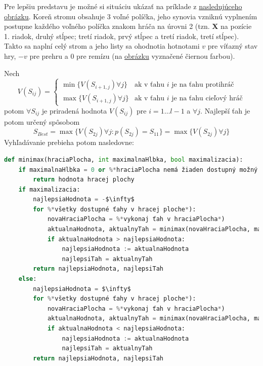 Pre lepšiu predstavu je možné si situáciu ukázať na príklade z \hyperref[figure:minimax-tree]{nasledujúceho obrázku}.
Koreň stromu obsahuje 3 voľné políčka, jeho synovia vzniknú vyplnením postupne každého voľného políčka znakom hráča na
úrovni 2 (tzn. \textbf{X} na pozície 1. riadok, druhý stĺpec; tretí riadok, prvý stĺpec a tretí riadok, tretí stĺpec).
Takto sa naplní celý strom a jeho listy sa ohodnotia hotnotami $v$ pre víťazný stav hry, $-v$ pre prehru a $0$ pre
remízu (na \hyperref[figure:minimax-tree]{obrázku} vyznačené čiernou farbou).

Nech
\begin{equation}
    V(S_{ij}) =
    \begin{cases}
        \min{\{V(S_{i+1,j}) \forall j\}} & \text{ak v ťahu } i \text{ je na ťahu protihráč} \\
        \max{\{V(S_{i+1,j}) \forall j\}} & \text{ak v ťahu } i \text{ je na ťahu cieľový hráč}
    \end{cases}
\end{equation}
potom $\forall S_{ij}$ je priradená hodnota $V(S_{ij})$ pre $i = 1 \dots l-1$ a $\forall j$.
Najlepší ťah je potom určený spôsobom
\begin{equation}
    S_{Best} = \max{\{V(S_{2j}) \forall j \colon p(S_{2j}) = S_{11}\}} = \max{\{V(S_{2j}) \forall j\}}
\end{equation}
Vyhľadávanie prebieha potom nasledovne:\cite{algo_minimax_pseudocode}
\begin{tiny}
    \begin{lstlisting}[language=Python]
def minimax(hraciaPlocha, int maximalnaHlbka, bool maximalizacia):
    if maximalnaHlbka = 0 or %*hraciaPlocha nemá žiaden dostupný možný ťah*):
        return hodnota hracej plochy
    if maximalizacia:
        najlepsiaHodnota = -$\infty$
        for %*všetky dostupné ťahy v hracej ploche*):
            novaHraciaPlocha = %*vykonaj ťah v hraciaPlocha*)
            aktualnaHodnota, aktualnyTah = minimax(novaHraciaPlocha, maximalnaHlbka - 1, false))
            if aktualnaHodnota > najlepsiaHodnota:
                najlepsiaHodnota := aktualnaHodnota
                najlepsiTah = aktualnyTah
        return najlepsiaHodnota, najlepsiTah
    else:
        najlepsiaHodnota = $\infty$
        for %*všetky dostupné ťahy v hracej ploche*):
            novaHraciaPlocha = %*vykonaj ťah v hraciaPlocha*)
            aktualnaHodnota, aktualnyTah = minimax(novaHraciaPlocha, maximalnaHlbka - 1, true))
            if aktualnaHodnota < najlepsiaHodnota:
                najlepsiaHodnota := aktualnaHodnota
                najlepsiTah = aktualnyTah
        return najlepsiaHodnota, najlepsiTah
\end{lstlisting}
\end{tiny}

